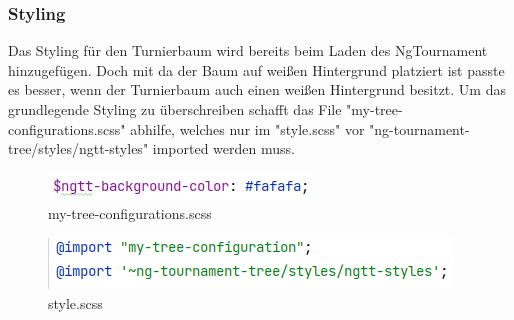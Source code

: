 \subsubsection{Styling}
Das Styling für den Turnierbaum wird bereits beim Laden des NgTournament hinzugefügen. Doch mit da der Baum auf weißen Hintergrund platziert ist passte es besser, wenn der Turnierbaum auch einen weißen Hintergrund besitzt.
Um das grundlegende Styling zu überschreiben schafft das File "my-tree-configurations.scss" abhilfe, welches nur im "style.scss" vor "ng-tournament-tree/styles/ngtt-styles" imported werden muss.

\begin{figure}[H]
    \includegraphics[scale=1]{pics/frontend/my_tree_css.PNG}
    \caption{my-tree-configurations.scss}
\end{figure}

\begin{figure}[H]
    \includegraphics[scale=1]{pics/frontend/style_css.PNG}
    \caption{style.scss}
\end{figure}